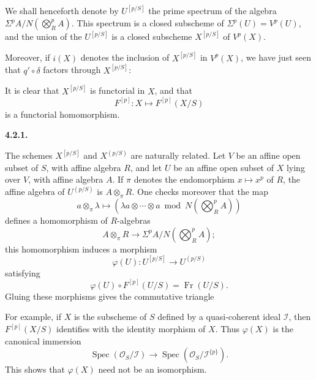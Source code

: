 We shall henceforth denote by \(U^{[p/S]}\) the prime spectrum of the
algebra \(\Sigma^p A/N(\bigotimes_R^p A)\). This spectrum is a closed
subscheme of \(\Sigma^p(U)=V^p(U)\), and the union of the
\(U^{[p/S]}\) is a closed subscheme \(X^{[p/S]}\) of \(V^p(X)\).

Moreover, if \(i(X)\) denotes the inclusion of \(X^{[p/S]}\) in
\(V^p(X)\), we have just seen that \(q'\circ\delta\) factors through
\(X^{[p/S]}\):
\begin{center}
  \label{sga3:VIIA:4.2-pfold-symmetric-factorization}
  
\end{center}
It is clear that \(X^{[p/S]}\) is functorial in \(X\), and that
\[
  F^{[p]}:X\longmapsto F^{[p]}(X/S)
\]
is a functorial homomorphism.

\medskip
\noindent\textbf{4.2.1.}
\label{sga3:VIIA:4.2.1}

The schemes \(X^{[p/S]}\) and \(X^{(p/S)}\) are naturally related.
Let \(V\) be an affine open subset of \(S\), with affine algebra
\(R\), and let \(U\) be an affine open subset of \(X\) lying over
\(V\), with affine algebra \(A\). If \(\pi\) denotes the
endomorphism \(x\mapsto x^p\) of \(R\), the affine algebra of
\(U^{(p/S)}\) is \(A\otimes_\pi R\). One checks moreover that the map
\[
  a\otimes_\pi\lambda
  \longmapsto
  \left(
    \lambda a\otimes\cdots\otimes a
    \bmod
    N\!\left(\bigotimes_R^p A\right)
  \right)
\]
defines a homomorphism of \(R\)-algebras
\[
  A\otimes_\pi R
  \longrightarrow
  \Sigma^p A\big/
    N\!\left(\bigotimes_R^p A\right);
\]
this homomorphism induces a morphism
\[
  \varphi(U):U^{[p/S]}\longrightarrow U^{(p/S)}
\]
satisfying
\[
  \varphi(U)\circ F^{[p]}(U/S)=\operatorname{Fr}(U/S).
\]
Gluing these morphisms gives the commutative triangle
\begin{center}
  \label{sga3:VIIA:4.2.1-phi-frobenius-triangle}
  
\end{center}

For example, if \(X\) is the subscheme of \(S\) defined by a
quasi-coherent ideal \(\mathcal I\), then
\(F^{[p]}(X/S)\) identifies with the identity morphism of \(X\).
Thus \(\varphi(X)\) is the canonical immersion
\[
  \operatorname{Spec}(\mathcal O_S/\mathcal I)
  \longrightarrow
  \operatorname{Spec}(\mathcal O_S/\mathcal I^{\{p\}}).
\]
This shows that \(\varphi(X)\) need not be an isomorphism.

